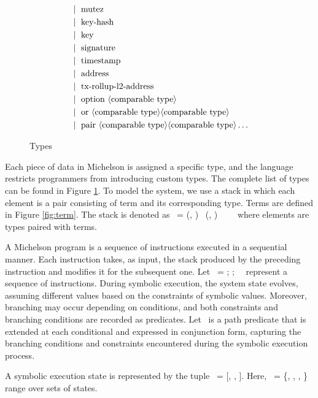 \documentclass[a4paper,UKenglish,cleveref, autoref, thm-restate]{lipics-v2021}
\begin{document}
\begin{figure} []
\begin{align*}
   &\mid\ \text{mutez}\\
   &\mid\ \text{key-hash}\\
   &\mid\ \text{key}\\
   &\mid\ \text{signature}\\
   &\mid\ \text{timestamp}\\
   &\mid\ \text{address}\\
   &\mid\ \text{tx-rollup-l2-address}\\
   &\mid\ \text{option}\ \langle\text{comparable type}\rangle\\
   &\mid\ \text{or}\ \langle\text{comparable type}\rangle \langle\text{comparable type}\rangle\\
   &\mid\ \text{pair}\ \langle\text{comparable type}\rangle \langle\text{comparable type}\rangle \dots \\
\end{align*}
\caption{Types}
\label{fig:type}
\end{figure}
Each piece of data in Michelson is assigned a specific type, and the language restricts programmers from introducing custom types. The complete list of types can be found in Figure \ref{fig:type}. To model the system, we use a stack in which each element is a pair consisting of term and its corresponding type. Terms are defined in Figure \ref{fig:term}. The stack is denoted as \STACK\ = (\TermOne, \TYF) \STACKCONCAT\ (\TermTwo, \TYS) \STACKCONCAT\ \DOT\ \STACKCONCAT\ \EMPTYSTACK\ where elements are types paired with terms. 

A Michelson program is a sequence of instructions executed in a sequential manner. Each instruction takes, as input, the stack produced by the preceding instruction and modifies it for the subsequent one. Let \INSTRUCTION\ = \InstructionOne; \InstructionTwo; \DOT\  \InstructionN\ represent a sequence of instructions.
During symbolic execution,  the system state evolves, assuming different values based on the constraints of symbolic values. Moreover, branching may occur depending on conditions, and both constraints and branching conditions are recorded as predicates. Let \PREDICATE\ is a path predicate that is extended at each conditional and expressed in conjunction form, capturing the branching conditions and constraints encountered during the symbolic execution process.
\begin{definition}
A symbolic execution state is represented by the tuple \STATE\ = [\INSTRUCTION, \STACK, \PREDICATE]. Here, \SYSTEM\ = \{\STATEONE, \STATETWO, \DOT, \STATEN \} range over sets of  states.
\end{definition}
\end{document}
